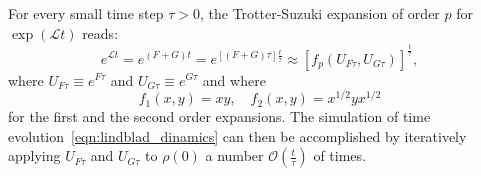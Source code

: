 For every small time step $\tau > 0$, the Trotter-Suzuki expansion of order $p$ for $\exp{(\mathcal{L} t)}$ reads:
\begin{equation*}
    e^{\mathcal{L}t} = e^{(F+ G)t} = e^{[(F+ G)\tau]\frac{t}{\tau}} \approx [f_p(U_{F\tau}, U_{G\tau})]^{\frac{t}{\tau}},
\end{equation*}
where $U_{F\tau} \equiv e^{F\tau}$ and $U_{G\tau} \equiv e^{G\tau}$ and where
\begin{equation*}
    f_1(x,y) = xy, \quad f_2(x, y) = x^{1/2}yx^{1/2}
\end{equation*}
for the first and the second order expansions.
The simulation of time evolution~\ref{eqn:lindblad_dinamics} can then be accomplished by iteratively applying $U_{F\tau}$ and $U_{G\tau}$ to $\rho(0)$ a number $\mathcal{O}(\frac{t}{\tau})$ of times.



